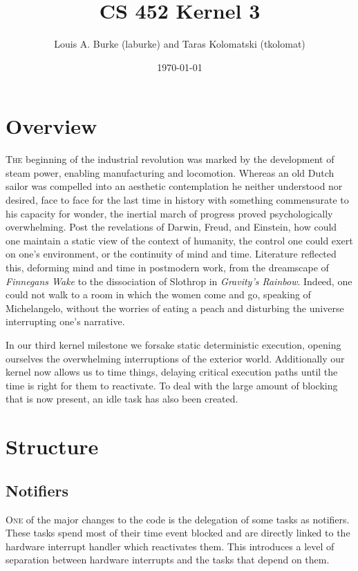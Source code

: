 \documentclass{article}
\title{\vspace{-3em}CS 452 Kernel 3}
\author{Louis A. Burke (laburke) and Taras Kolomatski (tkolomat)}
\date{\vspace{-0.9em}\today}
\begin{document}
\begingroup
\let\newpage\relax%
\maketitle
\endgroup

\section*{Overview}

\textsc{The} beginning of the industrial revolution was marked by the development of
steam power, enabling manufacturing and locomotion. Whereas an old Dutch sailor
was compelled into an aesthetic contemplation he neither understood nor desired,
face to face for the last time in history with something commensurate to his
capacity for wonder, the inertial march of progress proved psychologically
overwhelming. Post the revelations of Darwin, Freud, and Einstein, how could one
maintain a static view of the context of humanity, the control one could exert
on one's environment, or the continuity of mind and time. Literature reflected
this, deforming mind and time in postmodern work, from the dreamscape of
\textit{Finnegans Wake} to the dissociation of Slothrop in \textit{Gravity's
Rainbow}. Indeed, one could not walk to a room in which the women come and go,
speaking of Michelangelo, without the worries of eating a peach and disturbing
the universe interrupting one's narrative.

In our third kernel milestone we forsake static deterministic execution, opening
ourselves the overwhelming interruptions of the exterior world. Additionally our
kernel now allows us to time things, delaying critical execution paths until the
time is right for them to reactivate. To deal with the large amount of blocking
that is now present, an idle task has also been created.

\section*{Structure}

\subsection*{Notifiers}

\textsc{One} of the major changes to the code is the delegation of some tasks as
notifiers. These tasks spend most of their time event blocked and are directly
linked to the hardware interrupt handler which reactivates them. This introduces
a level of separation between hardware interrupts and the tasks that depend on
them.
\end{document}
